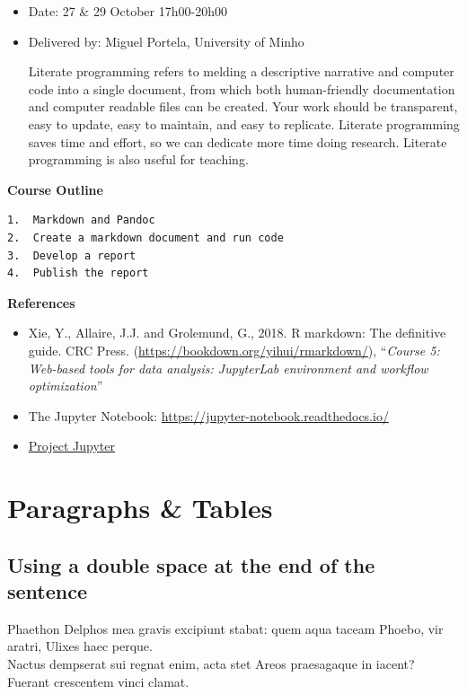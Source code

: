 \documentclass[
]{article}
\begin{document}
\begin{itemize}
\item
  Date: 27 \& 29 October \textbar{} 17h00-20h00
\item
  Delivered by: Miguel Portela, University of Minho

  Literate programming refers to melding a descriptive narrative and computer code into a single document, from which both human-friendly documentation and computer readable files can be created. Your work should be transparent, easy to update, easy to maintain, and easy to replicate. Literate programming saves time and effort, so we can dedicate more time doing research. Literate programming is also useful for teaching.
\end{itemize}

\textbf{Course Outline}

\begin{verbatim}
1.  Markdown and Pandoc
2.  Create a markdown document and run code
3.  Develop a report
4.  Publish the report
\end{verbatim}

\textbf{References}

\begin{itemize}
\item
  Xie, Y., Allaire, J.J. and Grolemund, G., 2018. R markdown: The definitive guide. CRC Press. (\url{https://bookdown.org/yihui/rmarkdown/}), ``\emph{Course 5: Web-based tools for data analysis: JupyterLab environment and workflow optimization}''
\item
  The Jupyter Notebook: \url{https://jupyter-notebook.readthedocs.io/}
\item
  \href{https://jupyter.org/}{Project Jupyter}
\end{itemize}

\hypertarget{paragraphs-tables}{%
\section{Paragraphs \& Tables}\label{paragraphs-tables}}

\hypertarget{using-a-double-space-at-the-end-of-the-sentence}{%
\subsection{Using a double space at the end of the sentence}\label{using-a-double-space-at-the-end-of-the-sentence}}

Phaethon Delphos mea gravis excipiunt stabat: quem aqua taceam Phoebo, vir
aratri, Ulixes haec perque.\\
Nactus dempserat sui regnat enim, acta stet Areos
praesagaque in iacent? Fuerant crescentem vinci clamat.
\end{document}
